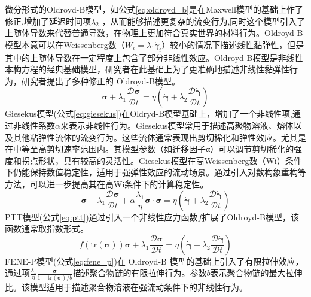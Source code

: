 微分形式的Oldroyd-B模型，如公式\eqref{eq:oldroyd_b}是在Maxwell模型的基础上作了修正,增加了延迟时间项$\lambda_2$ ，从而能够描述更复杂的流变行为,同时这个模型引入了上随体导数来代替普通导数，在物理上更加符合真实世界的材料行为\cite{oldroyd1958non}。Oldroyd-B模型本意可以在Weissenberg数（$W_i=\lambda_1 \dot{\gamma}_i$）较小的情况下描述线性黏弹性，但是其中的上随体导数在一定程度上包含了部分非线性效应。Oldroyd-B模型是非线性本构方程的经典基础模型，研究者在此基础上为了更准确地描述非线性黏弹性行为，研究者提出了多种修正的 Oldroyd-B模型。
\begin{equation}
	\boldsymbol{\sigma} + \lambda_1 \frac{\mathcal{D}\boldsymbol{\sigma}}{\mathcal{D}t} = \eta \left( \dot{\boldsymbol{\gamma}} + \lambda_2 \frac{\mathcal{D}\dot{\boldsymbol{\gamma}}}{\mathcal{D}t} \right) \label{eq:oldroyd_b}
\end{equation}
Giesekus模型(公式\eqref{eq:giesekus})在Oldryd-B模型基础上，增加了一个非线性项,通过非线性系数$\alpha$来表示非线性行为\cite{giesekus1982simple}。Giesekus模型常用于描述高聚物溶液、熔体以及其他粘弹性流体的流变行为。这些流体通常表现出剪切稀化和弹性效应。尤其是在中等至高剪切速率范围内。其模型参数（如迁移因子α）可以调节剪切稀化的强度和拐点形状，具有较高的灵活性\cite{PENG2021104571,kim2024viscosity}。Giesekus模型在高Weissenberg数（Wi）条件下仍能保持数值稳定性，适用于强弹性效应的流动场景。通过引入对数构象重构等方法，可以进一步提高其在高Wi条件下的计算稳定性\cite{fattal2004constitutive}。
\begin{equation}
	\boldsymbol{\sigma} + \lambda_1 \frac{\mathcal{D}\boldsymbol{\sigma}}{\mathcal{D}t} + \alpha \frac{\lambda_1}{\eta} \boldsymbol{\sigma} \cdot \boldsymbol{\sigma} = \eta \left( \dot{\boldsymbol{\gamma}} + \lambda_2 \frac{\mathcal{D}\dot{\boldsymbol{\gamma}}}{\mathcal{D}t} \right) \label{eq:giesekus}
\end{equation}
PTT模型(公式\eqref{eq:ptt})通过引入一个非线性应力函数$f$扩展了Oldroyd-B模型，该函数通常取指数形式\cite{thien1977new}。
\begin{equation}
	f(\text{tr}(\boldsymbol{\sigma})) \boldsymbol{\sigma} + \lambda_1 \frac{\mathcal{D}\boldsymbol{\sigma}}{\mathcal{D}t} = \eta \left( \dot{\boldsymbol{\gamma}} + \lambda_2 \frac{\mathcal{D}\dot{\boldsymbol{\gamma}}}{\mathcal{D}t} \right) \label{eq:ptt}
\end{equation}
FENE-P模型(公式\eqref{eq:fene_p})在 Oldroyd-B 模型的基础上引入了有限拉伸效应，通过项$\frac{\lambda_1}{\eta} \frac{\boldsymbol{\sigma}}{1 - \text{tr}(\boldsymbol{\sigma})/b}$描述聚合物链的有限拉伸行为\cite{bird1980polymer}。参数$b$表示聚合物链的最大拉伸比。该模型适用于描述聚合物溶液在强流动条件下的非线性行为。
